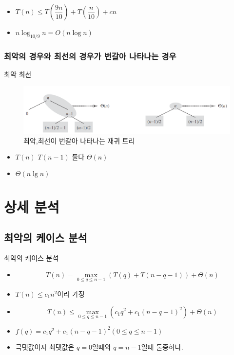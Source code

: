 \documentclass[10pt]{beamer}
\begin{document}
\begin{frame}{}
    \begin{itemize}
        \item $T(n) \le T\left(\dfrac{9n}{10}\right) + T\left(\dfrac{n}{10}\right)+ cn$
        \pause
        \item $n\log_{10/9}n = O(n \log n)$
    \end{itemize}
\end{frame}

\subsubsection{최악의 경우와 최선의 경우가 번갈아 나타나는 경우}


\begin{frame}{최악 최선}
    \begin{figure}[h!]
        \centering
        \includegraphics[scale=0.3]{./QuickSort/pic/q3.png}
        \caption{최악,최선이 번갈아 나타나는 재귀 트리\cite{reference1}}
    \end{figure}
    \pause
    \begin{itemize}
        \item $T(n)$ $T(n-1)$ 둘다 $\Theta(n)$
        \pause
        \item $\Theta(n \lg n)$
    \end{itemize}
\end{frame}


\section{상세 분석}

\subsection{최악의 케이스 분석}

\begin{frame}{최악의 케이스 분석}
    \begin{itemize}
        \pause
        \item $$T(n) = \max_{0 \le q \le n-1}(T(q) + T(n-q-1)) + \Theta(n)$$
        \pause
        \item $T(n) \le c_1n^2$이라 가정
        \pause
        \item $$T(n) \le \max_{0 \le q \le n-1}(c_1q^2 + c_1(n-q-1)^2) + \Theta(n)$$
        \pause
        \item $f(q) = c_1q^2 + c_1(n-q-1)^2 (0 \le q \le n-1)$
        \pause
        \item 극댓값이자 최댓값은 $q=0$일때와 $q=n-1$일때 둘중하나.
    \end{itemize}    
\end{frame}
\end{document}
